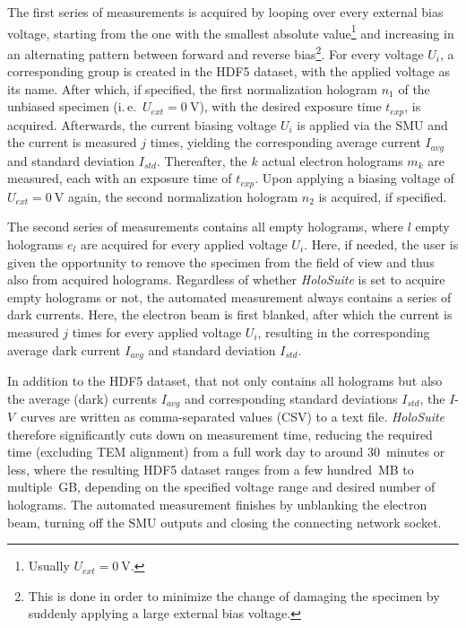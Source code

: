 The first series of measurements is acquired by looping over every external bias voltage, starting from the one with the smallest absolute value\footnote{Usually $U_{\mathit{ext}} = \SI{0}{\volt}$.} and increasing in an alternating pattern between forward and reverse bias\footnote{This is done in order to minimize the change of damaging the specimen by suddenly applying a large external bias voltage.}. For every voltage $U_i$, a corresponding group is created in the HDF5 dataset, with the applied voltage as its name. After which, if specified, the first normalization hologram $n_1$ of the unbiased specimen (i.\,e.\ $U_{\mathit{ext}} = \SI{0}{\volt}$), with the desired exposure time $t_{\mathit{exp}}$, is acquired. Afterwards, the current biasing voltage $U_i$ is applied via the SMU and the current is measured $j$ times, yielding the corresponding average current $I_{\mathit{avg}}$ and standard deviation $I_{\mathit{std}}$. Thereafter, the $k$ actual electron holograms $m_k$ are measured, each with an exposure time of $t_{\mathit{exp}}$. Upon applying a biasing voltage of $U_{\mathit{ext}} = \SI{0}{\volt}$ again, the second normalization hologram $n_2$ is acquired, if specified.

The second series of measurements contains all empty holograms, where $l$ empty holograms $e_l$ are acquired for every applied voltage $U_i$. Here, if needed, the user is given the opportunity to remove the specimen from the field of view and thus also from acquired holograms.
\newpage
Regardless of whether \emph{HoloSuite} is set to acquire empty holograms or not, the automated measurement always contains a series of dark currents. Here, the electron beam is first blanked, after which the current is measured $j$ times for every applied voltage $U_i$, resulting in the corresponding average dark current $I_{\mathit{avg}}$ and standard deviation $I_{\mathit{std}}$.

In addition to the HDF5 dataset, that not only contains all holograms but also the average (dark) currents $I_{\mathit{avg}}$ and corresponding standard deviations $I_{\mathit{std}}$, the $I$-$V$~curves are written as comma-separated values (CSV) to a text file. \emph{HoloSuite} therefore significantly cuts down on measurement time, reducing the required time (excluding TEM alignment) from a full work day to around 30~minutes or less, where the resulting HDF5 dataset ranges from a few hundred~MB to multiple~GB, depending on the specified voltage range and desired number of holograms. The automated measurement finishes by unblanking the electron beam, turning off the SMU outputs and closing the connecting network socket.
